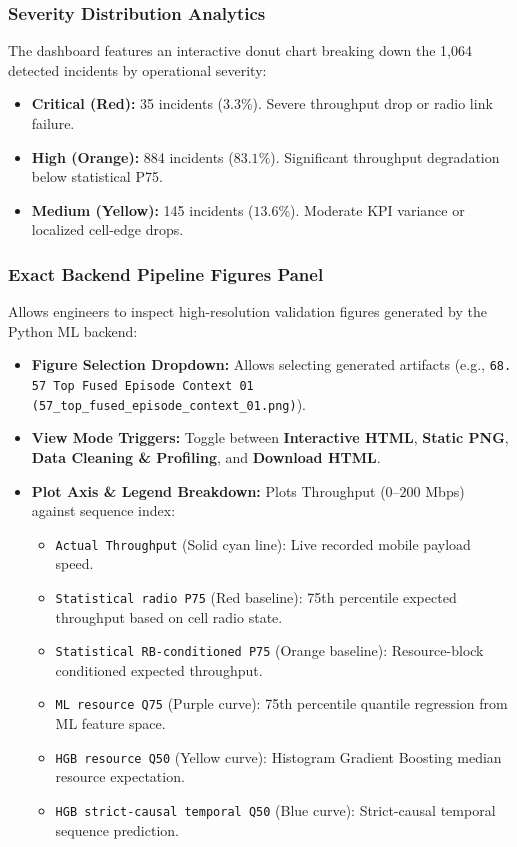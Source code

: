 \documentclass[12pt,a4paper]{report}
\begin{document}
\subsubsection{Severity Distribution Analytics}
The dashboard features an interactive donut chart breaking down the 1,064 detected incidents by operational severity:
\begin{itemize}
    \item \textbf{Critical (Red):} 35 incidents ($3.3\%$). Severe throughput drop or radio link failure.
    \item \textbf{High (Orange):} 884 incidents ($83.1\%$). Significant throughput degradation below statistical P75.
    \item \textbf{Medium (Yellow):} 145 incidents ($13.6\%$). Moderate KPI variance or localized cell-edge drops.
\end{itemize}

\subsubsection{Exact Backend Pipeline Figures Panel}
Allows engineers to inspect high-resolution validation figures generated by the Python ML backend:
\begin{itemize}
    \item \textbf{Figure Selection Dropdown:} Allows selecting generated artifacts (e.g., \texttt{68. 57 Top Fused Episode Context 01 (57\_top\_fused\_episode\_context\_01.png)}).
    \item \textbf{View Mode Triggers:} Toggle between \textbf{Interactive HTML}, \textbf{Static PNG}, \textbf{Data Cleaning \& Profiling}, and \textbf{Download HTML}.
    \item \textbf{Plot Axis \& Legend Breakdown:} Plots Throughput ($0$--$200$ Mbps) against sequence index:
    \begin{itemize}
        \item \texttt{Actual Throughput} (Solid cyan line): Live recorded mobile payload speed.
        \item \texttt{Statistical radio P75} (Red baseline): 75th percentile expected throughput based on cell radio state.
        \item \texttt{Statistical RB-conditioned P75} (Orange baseline): Resource-block conditioned expected throughput.
        \item \texttt{ML resource Q75} (Purple curve): 75th percentile quantile regression from ML feature space.
        \item \texttt{HGB resource Q50} (Yellow curve): Histogram Gradient Boosting median resource expectation.
        \item \texttt{HGB strict-causal temporal Q50} (Blue curve): Strict-causal temporal sequence prediction.
    \end{itemize}
\end{itemize}
\end{document}
